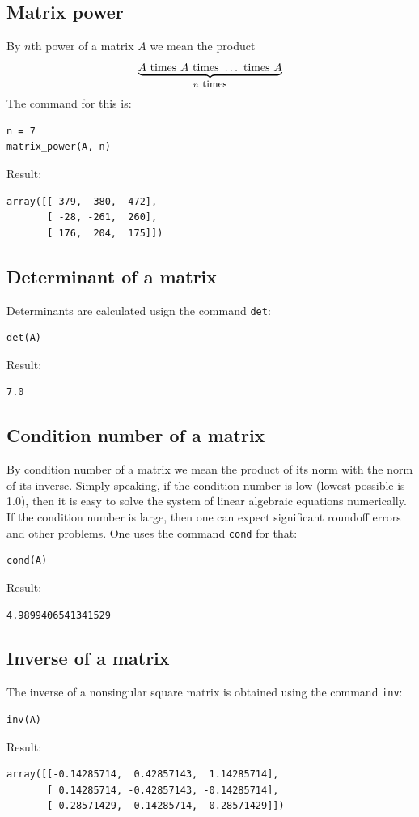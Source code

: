 \documentclass[article,A4,12pt]{llncs}
\begin{document}
\subsection{Matrix power}

By $n$th power of a matrix $A$ we mean the product
$$
\underbrace{A \ \mbox{times}\ A \ \mbox{times} \ \ldots \ \mbox{times} \ A}_{n \ {\small \mbox{times}}}
$$ 
The command for this is:
\begin{verbatim}
n = 7
matrix_power(A, n)
\end{verbatim}
Result:
\begin{verbatim}
array([[ 379,  380,  472],
       [ -28, -261,  260],
       [ 176,  204,  175]])
\end{verbatim}

\subsection{Determinant of a matrix}

Determinants are calculated usign the command {\tt det}:
\begin{verbatim}
det(A)
\end{verbatim}
Result:
\begin{verbatim}
7.0
\end{verbatim}

\subsection{Condition number of a matrix}

By condition number of a matrix we mean the product of its norm with the 
norm of its inverse. Simply speaking, if the condition number is low
(lowest possible is 1.0), then it is easy to solve the system of linear
algebraic equations numerically. If the condition number is large, then
one can expect significant roundoff errors and other problems. One uses
the command {\tt cond} for that:
\begin{verbatim}
cond(A)
\end{verbatim}
Result:
\begin{verbatim}
4.9899406541341529
\end{verbatim}

\subsection{Inverse of a matrix}

The inverse of a nonsingular square matrix is obtained using the command {\tt inv}:
\begin{verbatim}
inv(A)
\end{verbatim}
Result:
\begin{verbatim}
array([[-0.14285714,  0.42857143,  1.14285714],
       [ 0.14285714, -0.42857143, -0.14285714],
       [ 0.28571429,  0.14285714, -0.28571429]])
\end{verbatim}
\end{document}
